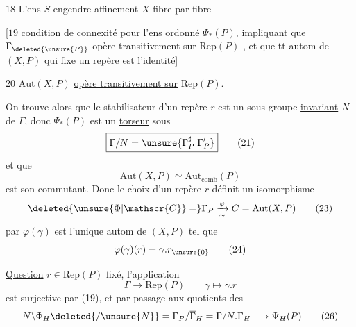 $\boxed{18}$ L'ens  $S$ engendre affinement $X$ fibre par fibre

[$\boxed{19}$ condition de connexité pour l'ens ordonné $\Psi_*(P)$, impliquant que $\Gamma_{\deleted{\unsure{P}}}$ opère transitivement sur $\mathrm{Rep}(P)$ , et que tt autom de $(X,P)$  qui fixe un repère est l'identité]

$\boxed{20}$ $\mathrm{Aut}(X,P)$ \uline{opère transitivement sur} $\mathrm{Rep}(P)$.

On trouve alors que le stabilisateur  d'un repère $r$ est un sous-groupe \uline{invariant} $N$ de $\Gamma$, donc $\Psi_*(P)$ est un \uline{torseur} sous
\[
 \boxed{\Gamma/N=\unsure{\Gamma_P^\sharp|\Gamma'_P}}\tag*{(21)}
\]
et que
\[
 \boxed{\mathrm{Aut}(X,P)\simeq\mathrm{Aut}_{\mathrm{comb}}(P)}\tag*{(22)}
\]
est son commutant. Donc le choix d'un repère $r$ définit un isomorphisme
\[
 \deleted{\unsure{\Phi|\mathscr{C}}=}\Gamma_P\xrightarrow[\sim]{\varphi}C=\mathrm{Aut}(X,P)\tag*{(23)}
\]
par  $\varphi(\gamma)$ est l'unique autom de $(X,P)$ tel que
\[
 \varphi(\gamma)(r)=\gamma.r_{\unsure{0}}\tag*{(24)}
\]

\uline{Question}  $r\in\mathrm{Rep}(P)$ fixé, l'application
\[
 \Gamma\longrightarrow\mathrm{Rep}(P)\qquad \gamma\longmapsto\gamma.r\tag*{(25)}
\]
est surjective par (19), et  par passage aux quotients des
\[
 N\backslash\Phi_H\deleted{/\unsure{N}}=\Gamma_P/\overline\Gamma_H=\Gamma/N.\Gamma_H\longrightarrow\Psi_H(P)\tag*{(26)}
\]
